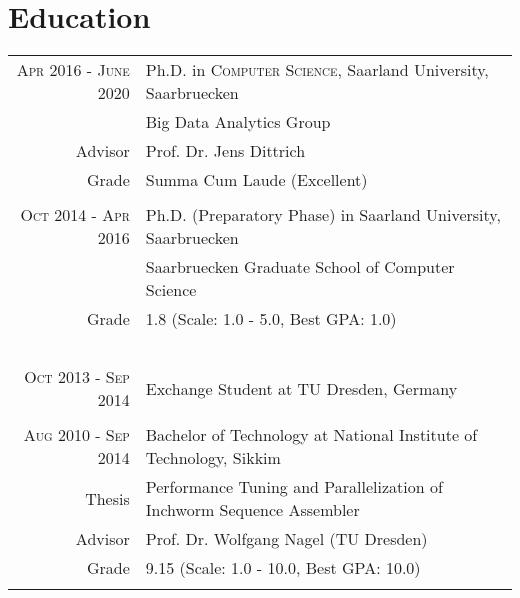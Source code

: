 \documentclass[a4paper,10pt]{article} %
\begin{document}
\section{Education}

\begin{tabular}{rl}	
\textsc{Apr 2016 - June 2020} & Ph.D. in \textsc{Computer Science}, Saarland University, Saarbruecken\\
& Big Data Analytics Group\\
Advisor & Prof. Dr. Jens Dittrich\\
Grade&Summa Cum Laude (Excellent)\\
&\\


\textsc{Oct 2014 - Apr 2016} & Ph.D. (Preparatory Phase) in Saarland University, Saarbruecken \\
& Saarbruecken Graduate School of Computer Science\\
Grade&1.8 (Scale: 1.0 - 5.0, Best GPA: 1.0)\\\
&\\


\textsc{Oct 2013 - Sep 2014} & Exchange Student at TU Dresden, Germany\\
&\\



\textsc{Aug 2010 - Sep 2014} & Bachelor of Technology at National Institute of Technology, Sikkim\\
Thesis & Performance Tuning and Parallelization of Inchworm Sequence Assembler\\
Advisor & Prof. Dr. Wolfgang Nagel (TU Dresden)\\
Grade& 9.15 (Scale: 1.0 - 10.0, Best GPA: 10.0)\\
&\\

\end{tabular}

\end{document}
